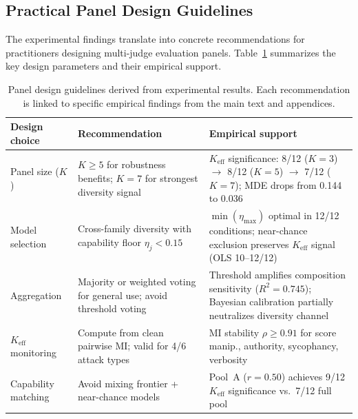 \subsection{Practical Panel Design Guidelines}
\label{app:panel_design_guide}

The experimental findings translate into concrete recommendations for practitioners designing multi-judge evaluation panels. Table~\ref{tab:design_guide} summarizes the key design parameters and their empirical support.

\begin{table}[t]
\centering
\small
\caption{Panel design guidelines derived from experimental results. Each recommendation is linked to specific empirical findings from the main text and appendices.}
\label{tab:design_guide}
\begin{tabular}{p{3.2cm}p{5cm}p{5cm}}
\toprule
\textbf{Design choice} & \textbf{Recommendation} & \textbf{Empirical support} \\
\midrule
Panel size ($K$) & $K{\geq}5$ for robustness benefits; $K{=}7$ for strongest diversity signal & $K_{\mathrm{eff}}$ significance: 8/12 ($K{=}3$) $\to$ 8/12 ($K{=}5$) $\to$ 7/12 ($K{=}7$); MDE drops from 0.144 to 0.036 \\
\addlinespace
Model selection & Cross-family diversity with capability floor $\eta_j{<}0.15$ & $\min(\eta_{\max})$ optimal in 12/12 conditions; near-chance exclusion preserves $K_{\mathrm{eff}}$ signal (OLS 10--12/12) \\
\addlinespace
Aggregation & Majority or weighted voting for general use; avoid threshold voting & Threshold amplifies composition sensitivity ($R^2{=}0.745$); Bayesian calibration partially neutralizes diversity channel \\
\addlinespace
$K_{\mathrm{eff}}$ monitoring & Compute from clean pairwise MI; valid for 4/6 attack types & MI stability $\rho{\geq}0.91$ for score manip., authority, sycophancy, verbosity \\
\addlinespace
Capability matching & Avoid mixing frontier + near-chance models & Pool~A ($r{=}0.50$) achieves 9/12 $K_{\mathrm{eff}}$ significance vs.\ 7/12 full pool \\
\bottomrule
\end{tabular}
\end{table}

